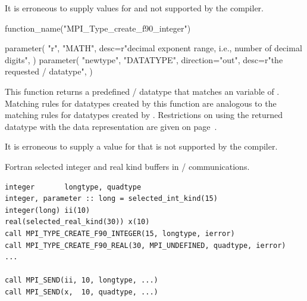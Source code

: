It is erroneous to supply values for  and  not
supported by the compiler.


\begin{mpi-binding}
    function_name("MPI_Type_create_f90_integer")

    parameter(
        "r",
        "MATH",
        desc=r"decimal exponent range, i.e., number of decimal digits",
    )
    parameter(
        "newtype",
        "DATATYPE",
        direction="out",
        desc=r"the requested \MPI/ datatype",
    )
\end{mpi-binding}

This function returns a predefined \MPI/ datatype that matches an  variable
of  .
Matching rules for datatypes created by this function are
analogous to the matching rules for datatypes created by
.
Restrictions on using the returned datatype with the 
data
representation are given on page~\pageref{f90:kind:external32}.

It is erroneous to supply a value for  that is not
supported by the compiler.

\begin{example}
Fortran selected integer and real kind buffers in \MPI/ communications.
\label{exa:lang:selected:kind}
%
\begin{lstlisting}[language={[MPI]Fortran}]
integer       longtype, quadtype
integer, parameter :: long = selected_int_kind(15)
integer(long) ii(10)
real(selected_real_kind(30)) x(10)
call MPI_TYPE_CREATE_F90_INTEGER(15, longtype, ierror)
call MPI_TYPE_CREATE_F90_REAL(30, MPI_UNDEFINED, quadtype, ierror)
...

call MPI_SEND(ii, 10, longtype, ...)
call MPI_SEND(x,  10, quadtype, ...)
\end{lstlisting}
\end{example}

